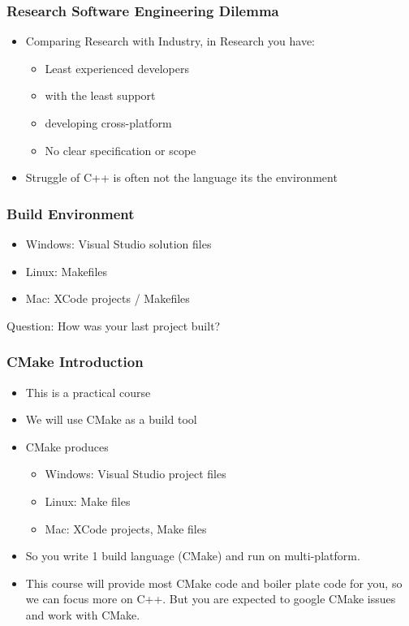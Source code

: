 \subsubsection{Research Software Engineering
Dilemma}\label{research-software-engineering-dilemma}

\begin{itemize}
\itemsep1pt\parskip0pt
\item
  Comparing Research with Industry, in Research you have:

  \begin{itemize}
  \itemsep1pt\parskip0pt
  \item
    Least experienced developers
  \item
    with the least support
  \item
    developing cross-platform
  \item
    No clear specification or scope
  \end{itemize}
\item
  Struggle of C++ is often not the language its the environment
\end{itemize}

\subsubsection{Build Environment}\label{build-environment}

\begin{itemize}
\itemsep1pt\parskip0pt
\item
  Windows: Visual Studio solution files
\item
  Linux: Makefiles
\item
  Mac: XCode projects / Makefiles
\end{itemize}

Question: How was your last project built?

\subsubsection{CMake Introduction}\label{cmake-introduction}

\begin{itemize}
\itemsep1pt\parskip0pt
\item
  This is a practical course
\item
  We will use CMake as a build tool
\item
  CMake produces

  \begin{itemize}
  \itemsep1pt\parskip0pt
  \item
    Windows: Visual Studio project files
  \item
    Linux: Make files
  \item
    Mac: XCode projects, Make files
  \end{itemize}
\item
  So you write 1 build language (CMake) and run on multi-platform.
\item
  This course will provide most CMake code and boiler plate code for
  you, so we can focus more on C++. But you are expected to google CMake
  issues and work with CMake.
\end{itemize}

